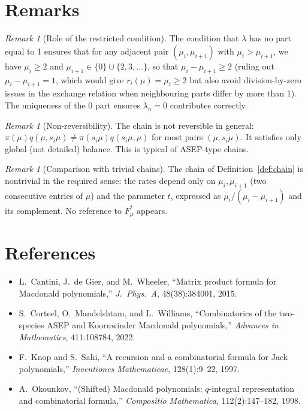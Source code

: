 \documentclass[12pt]{article}
\theoremstyle{definition}
\theoremstyle{remark}
\newtheorem{remark}[theorem]{Remark}
\begin{document}
\section{Remarks}

\begin{remark}[Role of the restricted condition]
The condition that $\lambda$ has no part equal to 1 ensures that for any
adjacent pair $(\mu_i,\mu_{i+1})$ with $\mu_i > \mu_{i+1}$, we have
$\mu_i \geq 2$ and $\mu_{i+1} \in \{0\} \cup \{2,3,\dots\}$, so that
$\mu_i - \mu_{i+1} \geq 2$ (ruling out $\mu_i - \mu_{i+1} = 1$, which would
give $r_i(\mu) = \mu_i \geq 2$ but also avoid division-by-zero issues in
the exchange relation when neighbouring parts differ by more than 1).
The uniqueness of the 0 part ensures $\lambda_n = 0$ contributes correctly.
\end{remark}

\begin{remark}[Non-reversibility]
The chain is not reversible in general: $\pi(\mu)q(\mu,s_i\mu) \neq
\pi(s_i\mu)q(s_i\mu,\mu)$ for most pairs $(\mu, s_i\mu)$.  It satisfies
only global (not detailed) balance.  This is typical of ASEP-type chains.
\end{remark}

\begin{remark}[Comparison with trivial chains]
The chain of Definition~\ref{def:chain} is nontrivial in the required sense:
the rates depend only on $\mu_i, \mu_{i+1}$ (two consecutive entries of $\mu$)
and the parameter $t$, expressed as $\mu_i/(\mu_i-\mu_{i+1})$ and its complement.
No reference to $F^*_\mu$ appears.
\end{remark}

\section*{References}

\begin{itemize}
\item L.~Cantini, J.~de Gier, and M.~Wheeler, ``Matrix product formula for
  Macdonald polynomials,'' \emph{J.\ Phys.\ A}, 48(38):384001, 2015.
\item S.~Corteel, O.~Mandelshtam, and L.~Williams, ``Combinatorics of the
  two-species ASEP and Koornwinder Macdonald polynomials,''
  \emph{Advances in Mathematics}, 411:108784, 2022.
\item F.~Knop and S.~Sahi, ``A recursion and a combinatorial formula for
  Jack polynomials,'' \emph{Inventiones Mathematicae}, 128(1):9--22, 1997.
\item A.~Okounkov, ``(Shifted) Macdonald polynomials:
  $q$-integral representation and combinatorial formula,''
  \emph{Compositio Mathematica}, 112(2):147--182, 1998.
\end{itemize}
\end{document}
